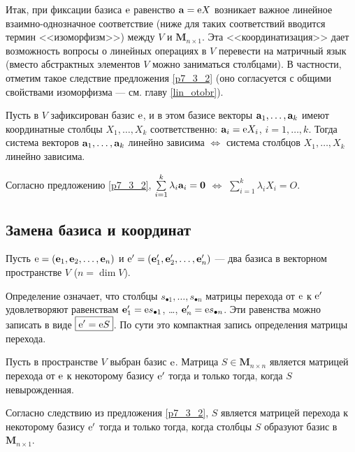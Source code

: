 \otstup

Итак, при фиксации базиса $\mathrm{e}$ равенство $\mathbf{a} = \mathrm{e} X$ возникает важное линейное взаимно-однозначное соответствие (ниже для таких соответствий вводится термин <<изоморфизм>>) между $V$ и $\mathbf{M}_{n\times 1}$. %
Эта <<координатизация>> дает возможность вопросы о линейных операциях в $V$ перевести на матричный язык
(вместо абстрактных элементов $V$ можно заниматься столбцами). В частности, отметим такое следствие
предложения \ref{p7_3_2} (оно согласуется с общими свойствами изоморфизма --- см. главу \ref{lin_otobr}).

\begin{sled}\label{sled7_3_2}
Пусть в $V$ зафиксирован базис $\mathrm{e}$, и в этом базисе векторы $\mathbf{a}_1, \ldots, \mathbf{a}_k$
имеют координатные столбцы $X_1,\ldots, X_k$ соответственно: $\mathbf{a}_i = \mathrm{e} X_i$, $i=1, \ldots, k$.
Тогда система векторов $\mathbf{a}_1, \ldots, \mathbf{a}_k$ линейно зависима $\Leftrightarrow$
система столбцов $X_1, \ldots, X_k$ линейно зависима.
\end{sled}
\dok 
Согласно предложению \ref{p7_3_2}, 
$\sum\limits_{i=1}^k \lambda_i\mathbf{a}_i = \mathbf{0}$ $\Leftrightarrow$ 
$\sum\limits_{i=1}^k \lambda_iX_i = O$.
\edok


\subsection{Замена базиса и координат}

Пусть $\mathrm{e} = (\mathbf{e}_1, \mathbf{e}_2, \ldots , \mathbf{e}_n)$ и
$\mathrm{e}' = (\mathbf{e}_1', \mathbf{e}_2', \ldots , \mathbf{e}_n')$ --- два базиса
в векторном пространстве $V$ ($n=\dim V$).


Определение означает, что столбцы $s_{\bullet 1}, \ldots , s_{\bullet n}$ матрицы перехода от 
$\mathrm{e}$ к $\mathrm{e}'$ удовлетворяют равенствам $\mathbf{e}_1' = \mathrm{e}s_{\bullet 1}$, \ldots, 
$\mathbf{e}_n' = \mathrm{e}s_{\bullet n}$.
Эти равенства можно записать в виде  $\boxed{\mathrm{e}' = \mathrm{e} S}$.
По сути это компактная запись определения матрицы перехода. 

\begin{predl}\label{p7_3_222}
Пусть в пространстве $V$ выбран базис $\mathrm{e}$. Матрица $S \in \mathbf{M}_{n\times n}$
является матрицей перехода от $\mathrm{e}$ к некоторому базису $\mathrm{e}'$ тогда и только тогда, 
когда $S$ невырожденная.
\end{predl}
\dok Согласно следствию из предложения \ref{p7_3_2}, $S$ является 
матрицей перехода к некоторому базису $\mathrm{e}'$ тогда и только тогда, 
когда столбцы $S$ образуют базис в $\mathbf{M}_{n\times 1}$.
\edok

